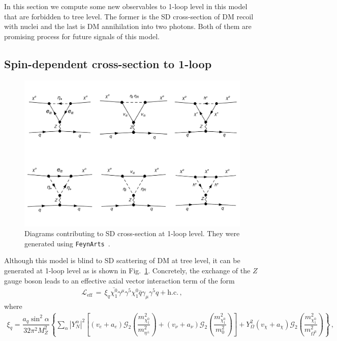 \documentclass[12pt,letterpaper]{article}
\begin{document}
In this section we compute some new observables to 1-loop level in this model that are forbidden to tree level. The former is the SD cross-section of DM recoil with nuclei and the last is DM annihilation into two photons. Both of them are promising process for future signals of this model.

\subsection{Spin-dependent cross-section to 1-loop}
\label{sec:sigma-SD}
%
\begin{figure}[h]
\begin{center}
\includegraphics[scale=0.45]{SD-diagrams}
\caption{ Diagrams contributing to SD cross-section at 1-loop level. They were generated using \texttt{FeynArts}~\cite{Hahn:2000kx}. }
\label{fig:SD}
\end{center}
\end{figure}
%
Although this model is blind to SD scattering of DM at tree level, it can be generated at 1-loop level as is shown in Fig.~\ref{fig:SD}. Concretely,  the exchange of the  $Z$ gauge boson leads to an effective axial vector interaction term of the form~\cite{Jungman:1995df, Ibarra:2016dlb}
%
\begin{align}
\label{eq:LSD-eff}
\mathcal{L}_{\text{eff}}\, =\, \xi_q \bar{\chi^0_1}\gamma^{\mu}\gamma^5 \chi^0_1 \bar{q}\gamma_{\mu}\gamma^5q + \text{h.c.}\,,
\end{align}
%
where
%
\begin{align}
\label{eq:xiq}
\xi_q = \dfrac{a_q \sin^2\alpha }{32\pi^2M_Z^2}
\left\{
\sum_{\alpha}|Y_N^{\alpha} |^2\left[
(v_{e}+a_{e}) \mathcal{G}_2\left(\dfrac{m_{\chi^0_1}^2}{m_{\eta^{\pm}}^2}\right) 
+ (v_{\nu}+a_{\nu}) \mathcal{G}_2\left(\dfrac{m_{\chi^0_1}^2}{m_0^2}\right) 
\right]
+ 
Y_{\Omega}^2(v_{\chi}+a_{\chi}) \mathcal{G}_2\left(\dfrac{m_{\chi^0_1}^2}{m_{\Omega^0}^2}\right) 
\right\}\,,
\end{align}
\end{document}
